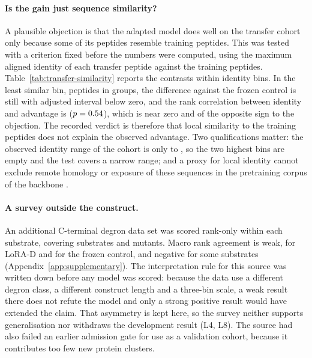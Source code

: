 \paragraph{Is the gain just sequence similarity?}
A plausible objection is that the adapted model does well on the transfer cohort only because some
of its peptides resemble training peptides. This was tested with a criterion fixed before the
numbers were computed, using the maximum aligned identity of each transfer peptide against the
\nVthreeNPeptides{} training peptides. Table~\ref{tab:transfer-similarity} reports the contrasts
within identity bins. In the least similar bin, \nTBottomBinN{} peptides in \nTBottomBinGroups{}
groups, the difference against the frozen control is still \nTBottomBinDelta{} with adjusted
interval \nTBottomBinCI{} below zero, and the rank correlation between identity and advantage is
\nTSimRho{} ($p=0.54{}$), which is near zero and of the opposite sign to the objection.
The recorded verdict is therefore that local similarity to the training peptides does not explain
the observed advantage. Two qualifications matter: the observed identity range of the cohort is only
\nTIdentityMin{} to \nTIdentityMax{}, so the two highest bins are empty and the test covers a narrow
range; and a proxy for local identity cannot exclude remote homology or exposure of these sequences
in the pretraining corpus of the backbone \citep{bernett2024}.

\begin{table}[htbp]
  \centering
  \caption[Transfer contrasts within sequence-identity bins]{Transfer contrasts within sequence-identity bins. Identity is the maximum aligned identity
  of a transfer peptide against the training peptides. Bins were fixed before computation and the
  two highest bins contain no data. Intervals adjust for four comparisons.}
  \label{tab:transfer-similarity}
  
\end{table}

\paragraph{A survey outside the construct.}
An additional C-terminal degron data set \citep{koren2018} was scored rank-only within each
substrate, covering \nTKorenSubstrates{} substrates and \nTKorenMutants{} mutants. Macro rank
agreement is weak, \nTKorenLora{} for LoRA-D and \nTKorenFrozen{} for the frozen control, and
negative for some substrates (Appendix~\ref{app:supplementary}). The interpretation rule for this
source was written down before any model was scored: because the data use a different degron class,
a different construct length and a three-bin scale, a weak result there does not refute the model
and only a strong positive result would have extended the claim. That asymmetry is kept here, so
the survey neither supports generalisation nor withdraws the development result (L4, L8). The source
had also failed an earlier admission gate for use as a validation cohort, because it contributes too
few new protein clusters.

